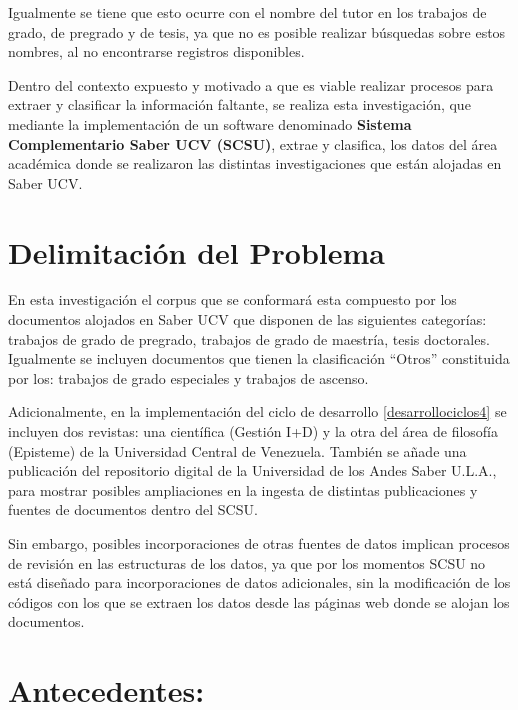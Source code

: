 \documentclass[
  12pt,
  openany]{book}
\begin{document}
Igualmente se tiene que esto ocurre con el nombre del tutor en los trabajos de grado, de pregrado y de tesis, ya que no es posible realizar búsquedas sobre estos nombres, al no encontrarse registros disponibles.

Dentro del contexto expuesto y motivado a que es viable realizar procesos para extraer y clasificar la información faltante, se realiza esta investigación, que mediante la implementación de un software denominado \textbf{Sistema Complementario Saber UCV (SCSU)}, extrae y clasifica, los datos del área académica donde se realizaron las distintas investigaciones que están alojadas en Saber UCV.

\hypertarget{delimitacion}{%
\section{Delimitación del Problema}\label{delimitacion}}

En esta investigación el corpus que se conformará esta compuesto por los documentos alojados en Saber UCV que disponen de las siguientes categorías: trabajos de grado de pregrado, trabajos de grado de maestría, tesis doctorales. Igualmente se incluyen documentos que tienen la clasificación ``Otros'' constituida por los: trabajos de grado especiales y trabajos de ascenso.

Adicionalmente, en la implementación del ciclo de desarrollo \ref{desarrollociclos4} se incluyen dos revistas: una científica (Gestión I+D) y la otra del área de filosofía (Episteme) de la Universidad Central de Venezuela. También se añade una publicación del repositorio digital de la Universidad de los Andes Saber U.L.A., para mostrar posibles ampliaciones en la ingesta de distintas publicaciones y fuentes de documentos dentro del SCSU.

Sin embargo, posibles incorporaciones de otras fuentes de datos implican procesos de revisión en las estructuras de los datos, ya que por los momentos SCSU no está diseñado para incorporaciones de datos adicionales, sin la modificación de los códigos con los que se extraen los datos desde las páginas web donde se alojan los documentos.

\hypertarget{antecedentes}{%
\section{Antecedentes:}\label{antecedentes}}
\end{document}
